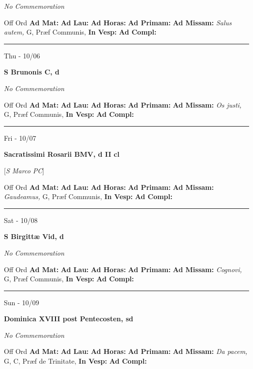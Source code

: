 \documentclass[letterpaper, 10pt]{article}
\begin{document}
\textit{No Commemoration}\begin{justify}
Off Ord
\textbf{Ad Mat: }
\textbf{Ad Lau: }
\textbf{Ad Horas: }
\textbf{Ad Primam: }
\textbf{Ad Missam:} \textit{Salus autem, } G, Præf Communis, 
\textbf{In Vesp: }
\textbf{Ad Compl: }\end{justify}



\hrule
\begin{center}
Thu - 10/06
\end{center}\textbf{ \large S Brunonis C, \textnormal{\normalsize d}}

\textit{No Commemoration}\begin{justify}
Off Ord
\textbf{Ad Mat: }
\textbf{Ad Lau: }
\textbf{Ad Horas: }
\textbf{Ad Primam: }
\textbf{Ad Missam:} \textit{Os justi, } G, Præf Communis, 
\textbf{In Vesp: }
\textbf{Ad Compl: }\end{justify}



\hrule
\begin{center}
Fri - 10/07
\end{center}\textbf{ \large Sacratissimi Rosarii BMV, \textnormal{\normalsize d II cl}}

[\textit{S Marco PC}]
\begin{justify}
Off Ord
\textbf{Ad Mat: }
\textbf{Ad Lau: }
\textbf{Ad Horas: }
\textbf{Ad Primam: }
\textbf{Ad Missam:} \textit{Gaudeamus, } G, Præf Communis, 
\textbf{In Vesp: }
\textbf{Ad Compl: }\end{justify}



\hrule
\begin{center}
Sat - 10/08
\end{center}\textbf{ \large S Birgittæ Vid, \textnormal{\normalsize d}}

\textit{No Commemoration}\begin{justify}
Off Ord
\textbf{Ad Mat: }
\textbf{Ad Lau: }
\textbf{Ad Horas: }
\textbf{Ad Primam: }
\textbf{Ad Missam:} \textit{Cognovi, } G, Præf Communis, 
\textbf{In Vesp: }
\textbf{Ad Compl: }\end{justify}



\hrule
\begin{center}
Sun - 10/09
\end{center}\textbf{ \large Dominica XVIII post Pentecosten, \textnormal{\normalsize sd}}

\textit{No Commemoration}\begin{justify}
Off Ord
\textbf{Ad Mat: }
\textbf{Ad Lau: }
\textbf{Ad Horas: }
\textbf{Ad Primam: }
\textbf{Ad Missam:} \textit{Da pacem, } G, C, Præf de Trinitate, 
\textbf{In Vesp: }
\textbf{Ad Compl: }\end{justify}
\end{document}
